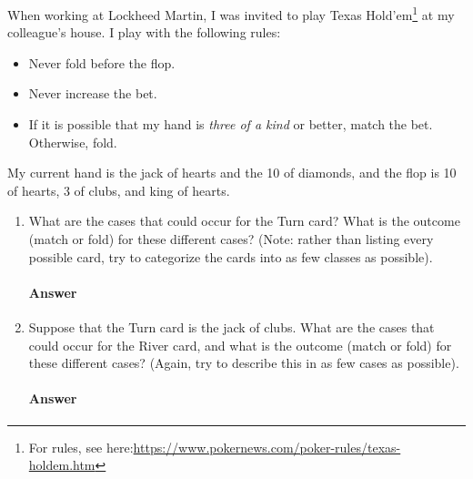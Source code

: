 \documentclass{article}
\begin{document}
\collab{\todo{}}

When working at Lockheed Martin, I was invited to play Texas
Hold'em\footnote{For rules, see
here:\url{https://www.pokernews.com/poker-rules/texas-holdem.htm}} at my
colleague's house.  I play with the following rules:
\begin{itemize}
    \item Never fold before the flop.
    \item Never increase the bet.
    \item If it is possible that my hand is \emph{three of a kind} or better,
        match the bet.  Otherwise, fold.
\end{itemize}
My current hand is the jack of hearts and the 10 of diamonds, and the flop is 10
of hearts, 3 of clubs, and king of hearts.

\begin{enumerate}

    \item What are the cases that could occur for the Turn card?  What is the
        outcome (match or fold) for these different cases? (Note: rather than
        listing every possible card, try to categorize the cards into as few
        classes as possible).

    \paragraph{Answer}

    \item Suppose that the Turn card is the jack of clubs.
        What are the cases that could occur for the River card, and what is the
        outcome (match or fold) for these different cases?  (Again, try to
        describe this in as few cases as possible).

    \paragraph{Answer}

\end{enumerate}


\collab{\todo{}}
\end{document}
